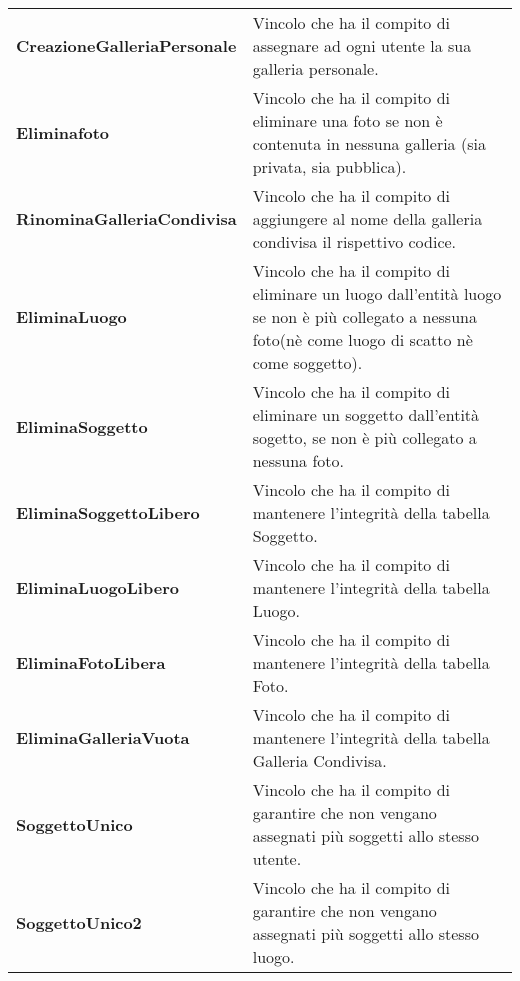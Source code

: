 \begin{xltabular}{\textwidth}{l X}
        \textbf{CreazioneGalleriaPersonale} & Vincolo che ha il compito di assegnare ad ogni utente la sua galleria personale. \\

        \textbf{Eliminafoto} & Vincolo che ha il compito di eliminare una foto se non è contenuta in nessuna galleria (sia privata, sia pubblica).\\

        \textbf{RinominaGalleriaCondivisa} & Vincolo che ha il compito di aggiungere al nome della galleria condivisa il rispettivo codice. \\

        \textbf{EliminaLuogo} & Vincolo che ha il compito di eliminare un luogo dall'entità luogo se non è più collegato a nessuna foto(nè come luogo di scatto nè come soggetto). \\

        \textbf{EliminaSoggetto} & Vincolo che ha il compito di eliminare un soggetto dall'entità sogetto, se non è più collegato a nessuna foto. \\
\hline
        \textbf{EliminaSoggettoLibero} & Vincolo che ha il compito di mantenere l'integrità della tabella Soggetto. \\

        \textbf{EliminaLuogoLibero} & Vincolo che ha il compito di mantenere l'integrità della tabella Luogo. \\

        \textbf{EliminaFotoLibera} & Vincolo che ha il compito di mantenere l'integrità della tabella Foto. \\

        \textbf{EliminaGalleriaVuota} & Vincolo che ha il compito di mantenere l'integrità della tabella Galleria Condivisa. \\

        \textbf{SoggettoUnico} & Vincolo che ha il compito di garantire che non vengano assegnati più soggetti allo stesso utente. \\

        \textbf{SoggettoUnico2} & Vincolo che ha il compito di garantire che non vengano assegnati più soggetti allo stesso luogo. \\

 \end{xltabular}
\endgroup